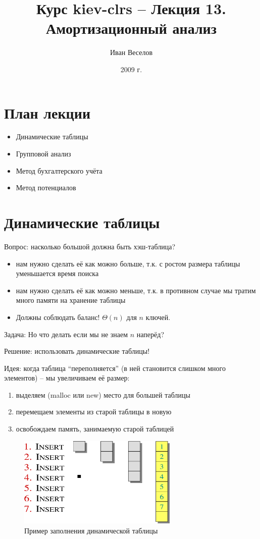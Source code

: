 \documentclass[a4paper,11pt]{article}
\author{Иван Веселов}
\title{Курс kiev-clrs -- Лекция 13. Амортизационный анализ}
\date{2009 г.}
\begin{document}
\maketitle
\tableofcontents
\newpage

\setlength{\parskip}{1ex plus 0.5ex minus 0.2ex}

\section{План лекции}
\begin{itemize}
\item Динамические таблицы
\item Групповой анализ
\item Метод бухгалтерского учёта
\item Метод потенциалов
\end{itemize}

\section{Динамические таблицы}

Вопрос: насколько большой должна быть хэш-таблица?
\begin{itemize}
\item нам нужно сделать её как можно больше, т.к. с ростом размера таблицы
  уменьшается время поиска
\item нам нужно сделать её как можно меньше, т.к. в противном случае мы тратим
  много памяти на хранение таблицы
\item Должны соблюдать баланс! $\Theta(n)$ для $n$ ключей.
\end{itemize}

Задача: Но что делать если мы не знаем $n$ наперёд?

Решение: использовать динамические таблицы!

Идея: когда таблица ``переполняется'' (в ней становится слишком много элементов)
-- мы увеличиваем её размер:

\begin{enumerate}
\item выделяем (malloc или new) место для большей таблицы
\item перемещаем элементы из старой таблицы в новую
\item освобождаем память, занимаемую старой таблицей
\end{enumerate}

\begin{figure}[ht]
  \centering
  \includegraphics[width=3in]{lecture13/insertion.eps}
  \caption{Пример заполнения динамической таблицы}
  \label{fig:insertion}
\end{figure}
\end{document}
